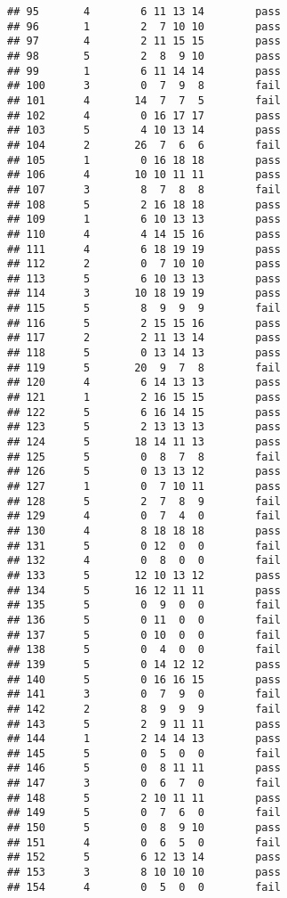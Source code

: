 \documentclass[
]{article}
\begin{document}
\begin{verbatim}
## 95       4        6 11 13 14        pass
## 96       1        2  7 10 10        pass
## 97       4        2 11 15 15        pass
## 98       5        2  8  9 10        pass
## 99       1        6 11 14 14        pass
## 100      3        0  7  9  8        fail
## 101      4       14  7  7  5        fail
## 102      4        0 16 17 17        pass
## 103      5        4 10 13 14        pass
## 104      2       26  7  6  6        fail
## 105      1        0 16 18 18        pass
## 106      4       10 10 11 11        pass
## 107      3        8  7  8  8        fail
## 108      5        2 16 18 18        pass
## 109      1        6 10 13 13        pass
## 110      4        4 14 15 16        pass
## 111      4        6 18 19 19        pass
## 112      2        0  7 10 10        pass
## 113      5        6 10 13 13        pass
## 114      3       10 18 19 19        pass
## 115      5        8  9  9  9        fail
## 116      5        2 15 15 16        pass
## 117      2        2 11 13 14        pass
## 118      5        0 13 14 13        pass
## 119      5       20  9  7  8        fail
## 120      4        6 14 13 13        pass
## 121      1        2 16 15 15        pass
## 122      5        6 16 14 15        pass
## 123      5        2 13 13 13        pass
## 124      5       18 14 11 13        pass
## 125      5        0  8  7  8        fail
## 126      5        0 13 13 12        pass
## 127      1        0  7 10 11        pass
## 128      5        2  7  8  9        fail
## 129      4        0  7  4  0        fail
## 130      4        8 18 18 18        pass
## 131      5        0 12  0  0        fail
## 132      4        0  8  0  0        fail
## 133      5       12 10 13 12        pass
## 134      5       16 12 11 11        pass
## 135      5        0  9  0  0        fail
## 136      5        0 11  0  0        fail
## 137      5        0 10  0  0        fail
## 138      5        0  4  0  0        fail
## 139      5        0 14 12 12        pass
## 140      5        0 16 16 15        pass
## 141      3        0  7  9  0        fail
## 142      2        8  9  9  9        fail
## 143      5        2  9 11 11        pass
## 144      1        2 14 14 13        pass
## 145      5        0  5  0  0        fail
## 146      5        0  8 11 11        pass
## 147      3        0  6  7  0        fail
## 148      5        2 10 11 11        pass
## 149      5        0  7  6  0        fail
## 150      5        0  8  9 10        pass
## 151      4        0  6  5  0        fail
## 152      5        6 12 13 14        pass
## 153      3        8 10 10 10        pass
## 154      4        0  5  0  0        fail

\end{verbatim}
\end{document}
